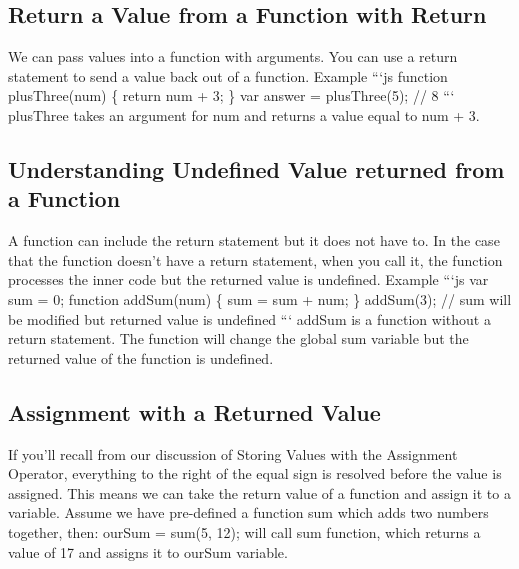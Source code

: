 \documentclass{article}%
\begin{document}
\subsection{Return a Value from a Function with Return}%
\label{subsec:ReturnaValuefromaFunctionwithReturn}%
We can pass values into a function with arguments. You can use a return statement to send a value back out of a function.\newline%
Example\newline%
```js\newline%
function plusThree(num) \{\newline%
  return num + 3;\newline%
\}\newline%
var answer = plusThree(5); // 8\newline%
```\newline%
plusThree takes an argument for num and returns a value equal to num + 3.\newline%

%
\subsection{Understanding Undefined Value returned from a Function}%
\label{subsec:UnderstandingUndefinedValuereturnedfromaFunction}%
A function can include the return statement but it does not have to. In the case that the function doesn't have a return statement, when you call it, the function processes the inner code but the returned value is undefined.\newline%
Example\newline%
```js\newline%
var sum = 0;\newline%
function addSum(num) \{\newline%
  sum = sum + num;\newline%
\}\newline%
addSum(3); // sum will be modified but returned value is undefined\newline%
```\newline%
addSum is a function without a return statement. The function will change the global sum variable but the returned value of the function is undefined.\newline%

%
\subsection{Assignment with a Returned Value}%
\label{subsec:AssignmentwithaReturnedValue}%
If you'll recall from our discussion of Storing Values with the Assignment Operator, everything to the right of the equal sign is resolved before the value is assigned. This means we can take the return value of a function and assign it to a variable.\newline%
Assume we have pre{-}defined a function sum which adds two numbers together, then:\newline%
ourSum = sum(5, 12);\newline%
will call sum function, which returns a value of 17 and assigns it to ourSum variable.\newline%
\end{document}
